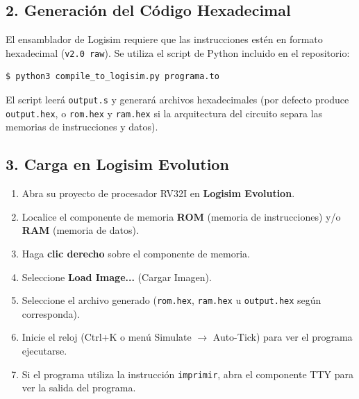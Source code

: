 \subsection{2. Generación del Código Hexadecimal}

El ensamblador de Logisim requiere que las instrucciones estén en formato hexadecimal (\texttt{v2.0 raw}). Se utiliza el script de Python incluido en el repositorio:

\begin{lstlisting}[language=bash, style=cstyle]
$ python3 compile_to_logisim.py programa.to
\end{lstlisting}

El script leerá \texttt{output.s} y generará archivos hexadecimales (por defecto produce \texttt{output.hex}, o \texttt{rom.hex} y \texttt{ram.hex} si la arquitectura del circuito separa las memorias de instrucciones y datos).

\subsection{3. Carga en Logisim Evolution}

\begin{enumerate}
    \item Abra su proyecto de procesador RV32I en \textbf{Logisim Evolution}.
    \item Localice el componente de memoria \textbf{ROM} (memoria de instrucciones) y/o \textbf{RAM} (memoria de datos).
    \item Haga \textbf{clic derecho} sobre el componente de memoria.
    \item Seleccione \textbf{Load Image...} (Cargar Imagen).
    \item Seleccione el archivo generado (\texttt{rom.hex}, \texttt{ram.hex} u \texttt{output.hex} según corresponda).
    \item Inicie el reloj (Ctrl+K o menú Simulate $\rightarrow$ Auto-Tick) para ver el programa ejecutarse.
    \item Si el programa utiliza la instrucción \texttt{imprimir}, abra el componente TTY para ver la salida del programa.
\end{enumerate}
